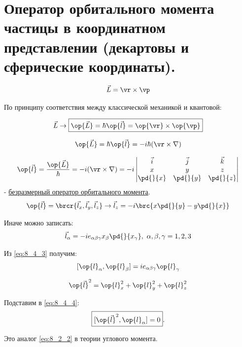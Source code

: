 \section{Оператор орбитального момента частицы в координатном представлении (декартовы и сферические координаты).}

$$
\vec{L} = \vr \times \vp
$$

По принципу соответствия между классической механикой и квантовой:

\begin{equation}
\label{eq:8_4_1}
  \vec{L} \to \boxed{\op{\vec{L}} = \hbar \op{\vec{l}} = \op{\vr} \times \op{\vp}}
\end{equation}

\begin{equation}
\label{eq:8_4_2}
  \op{\vec{L}} = \hbar \op{\vec{l}} = -i\hbar(\vr \times \nabla)
\end{equation}

$$
\op{\vec{l}} = \frac{\op{\vec L}}{\hbar} = -i(\vr \times \nabla) = -i \left| 
  \begin{matrix}
  \vec{i} & \vec{j} & \vec{k}\\
  x & y & z\\
  \pd{}{x} & \pd{}{y} & \pd{}{z}\\
  \end{matrix}
  \right |
$$
- \underline{безразмерный оператор орбитального момента}.
$$
\op{\vec l} = \brcr{\vec{l}_x, \vec{l}_y, \vec{l}_z} \to \vec{l}_z = -i \brc{x \pd{}{y} - y \pd{}{x}}
$$

Иначе можно записать:
\begin{equation}
\label{eq:8_4_3}
  \vec{l}_\alpha = -i e_{\alpha \beta \gamma} x_\beta \pd{}{x_\gamma},~\alpha, \beta, \gamma = 1, 2, 3
\end{equation}

Из \eqref{eq:8_4_3} получим:
\begin{equation}
\label{eq:8_4_4}
  [\op{l}_\alpha, \op{l}_\beta] = i e_{\alpha \beta \gamma} \op{l}_\gamma
\end{equation}

$$
\op{\vec{l}}^2 = \op{l}^2_x + \op{l}^2_y + \op{l}^2_z
$$

Подставим в \eqref{eq:8_4_4}: 
\begin{equation}
\label{eq:8_4_5}
  \boxed{[\op{\vec{l}}^2, \op{l}_\alpha] = 0}.
\end{equation}

Это аналог \eqref{eq:8_2_2} в теории углового момента.

